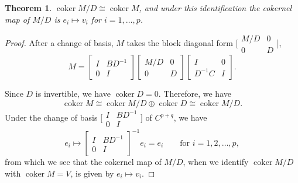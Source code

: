 \documentclass[10pt,a4paper]{amsart}
\numberwithin{equation}{section}
\newtheorem{Theorem}{Theorem}[section]
\newcommand{\C}{{\mathbb C}}
\newcommand{\la}{\label}
\DeclareMathOperator{\coker}{coker}
\def\C{C}
\begin{document}
		\begin{Theorem}\la{thm::schur}
			$\coker M/D \cong \coker M$, and under this identification the cokernel map of $M/D$ is $e_i \mapsto v_i$ for $i=1,\dots,p$.
		\end{Theorem}
		\begin{proof}
			After a change of basis, $M$ takes the block diagonal form $\bigl[\begin{smallmatrix} M/D &0\\ 0&D \end{smallmatrix}\bigr]$,
			\[
			M=\begin{bmatrix}
				I & B D^{-1}\\
				0 & I
			\end{bmatrix}
			\begin{bmatrix} M/D &0\\ 0&D \end{bmatrix}
			\begin{bmatrix}
				I & 0\\
				D^{-1}C & I
			\end{bmatrix}.
			\]
			
			Since $D$ is invertible, we have $\coker D=0$. Therefore, we have
			\[
			\coker M \cong \coker M/D \oplus \coker D \cong \coker M/D.
			\]
			Under the change of basis $\big[\begin{smallmatrix}
				I & B D^{-1}\\
				0 & I
			\end{smallmatrix}\bigr]$ of $\C^{p+q}$, we have
			\[
			e_i \mapsto \begin{bmatrix}
				I & B D^{-1}\\
				0 & I
			\end{bmatrix}^{-1} e_i = e_i\qquad \text{for }i =1,2,\dots,p,
			\]
			from which we see that the cokernel map of $M/D$, when we identify $\coker M/D$ with ${\coker M\!=\!V}$, is given by $e_i \mapsto v_i$.
		\end{proof}
\end{document}
